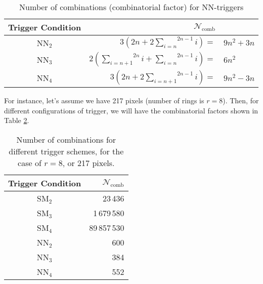 \documentclass{article}
\def\Ncomb{\ensuremath{\mathcal{N}_{\mathrm{comb}}}\xspace}
\def\Npix{\ensuremath{N_{\mathrm{pix}}}\xspace}
\begin{document}
\begin{table}[b]
\begin{center}
  \begin{tabular}{crl}
    Trigger Condition & \Ncomb \\
    \hline
    NN$_2$  & 
    $3\left(2n+2\overset{2n-1}{\underset{i=n}\sum} i\right) =$& $9n^2+3n$ \\
    NN$_3$  & 
    $2\left(\overset{2n}{\underset{i=n+1}\sum} i + 
            \overset{2n-1}{\underset{i=n}\sum} i\right) =$& $6n^2$ \\
    NN$_4$  & 
    $3\left(2n+2\overset{2n-1}{\underset{i=n+1}\sum} i\right) =$& $9n^2-3n$ \\
  \end{tabular}
  \caption[Number of combinations for NN-triggers]{Number of 
     combinations (combinatorial factor) for NN-triggers}
  \label{table:Ncomb}
\end{center}
\end{table}

For instance, let's assume we have 217 pixels (number of rings is
$r=8$). Then, for different configurations of trigger, we will have
the combinatorial factors shown in Table \ref{table:Ncomb_example}.

\begin{table}[t]
\begin{center}
  \begin{tabular}{cr}
    Trigger Condition & \Ncomb \\
    \hline
    SM$_2$  & 23\,436 \\
    SM$_3$  & 1\,679\,580 \\
    SM$_4$  & 89\,857\,530 \\
    NN$_2$  & 600 \\
    NN$_3$  & 384 \\
    NN$_4$  & 552 \\
  \end{tabular}
  \caption[Number of combinations for different trigger
     schemes]{Number of combinations for different trigger schemes, 
     for the case of $r=8$, or 217 pixels.}
  \label{table:Ncomb_example}
\end{center}
\end{table}
\end{document}

